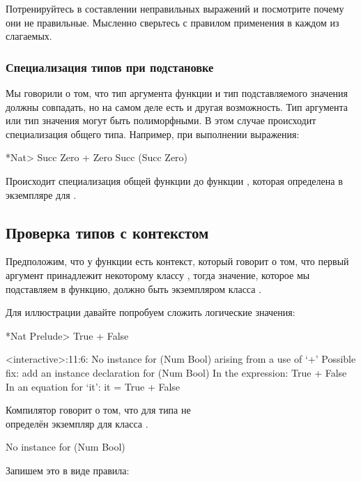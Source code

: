 Потренируйтесь в составлении неправильных выражений и посмотрите почему
они не правильные. Мысленно сверьтесь с правилом применения в каждом из
слагаемых.

\subsubsection{Специализация типов при подстановке}

Мы говорили о том, что тип аргумента функции и тип подставляемого
значения должны совпадать, но на самом деле есть и другая возможность.
Тип аргумента или тип значения могут быть полиморфными. В этом случае
происходит специализация общего типа. Например, при выполнении
выражения:


\begin{code}
*Nat> Succ Zero + Zero
Succ (Succ Zero)
\end{code}

Происходит специализация общей функции 
до функции , которая определена в
экземпляре  для .

\subsection{Проверка типов с контекстом}

Предположим, что у функции  есть контекст, который говорит о том,
что первый аргумент принадлежит некоторому классу
, тогда значение, которое мы подставляем в
функцию, должно быть экземпляром класса .

Для иллюстрации давайте попробуем сложить логические значения:


\begin{code}
*Nat Prelude> True + False

<interactive>:11:6:
    No instance for (Num Bool)
      arising from a use of `+'
    Possible fix: add an instance declaration for (Num Bool)
    In the expression: True + False
    In an equation for `it': it = True + False
\end{code}

Компилятор говорит о том, что для типа  не\\определён экземпляр
для класса .


\begin{code}
No instance for (Num Bool) 
\end{code}

Запишем это в виде правила:


